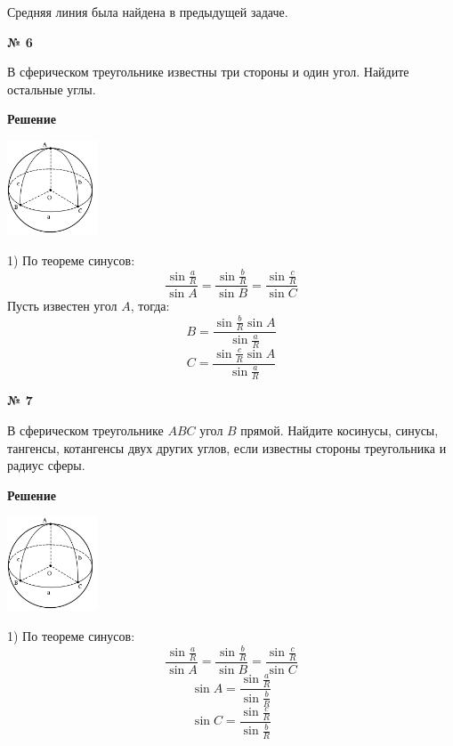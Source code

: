     Средняя линия была найдена в предыдущей задаче.

    \begin{center}
        \textbf{№ 6}
    \end{center}

    В сферическом треугольнике известны три стороны и один угол.
    Найдите остальные углы.

    \textbf{Решение}\\

    \begin{center}
        \includegraphics[width=0.2\textwidth]{images/img7}\\
    \end{center}

    1) По теореме синусов:
    \[
        \frac{\sin\frac{a}{R}}{\sin A} = \frac{\sin\frac{b}{R}}{\sin B} = \frac{\sin\frac{c}{R}}{\sin C}
    \]
    Пусть известен угол $A$, тогда:
    \[
        B = \frac{\sin \frac{b}{R}\sin A}{\sin\frac{a}{R}}
    \]
    \[
        C = \frac{\sin\frac{c}{R}\sin A}{\sin\frac{a}{R}}
    \]

    \begin{center}
        \textbf{№ 7}
    \end{center}

    В сферическом треугольнике $ABC$ угол $B$ прямой.
    Найдите косинусы, синусы, тангенсы, котангенсы двух других углов,
    если известны стороны треугольника и радиус сферы.

    \textbf{Решение}\\

    \begin{center}
        \includegraphics[width=0.2\textwidth]{images/img8}\\
    \end{center}

    1) По теореме синусов:
    \[
        \frac{\sin\frac{a}{R}}{\sin A} = \frac{\sin\frac{b}{R}}{\sin B} = \frac{\sin\frac{c}{R}}{\sin C}
    \]
    \[
        \sin A = \frac{\sin\frac{a}{R}}{\sin\frac{b}{R}}
    \]
    \[
        \sin C = \frac{\sin\frac{c}{R}}{\sin\frac{b}{R}}
    \]

